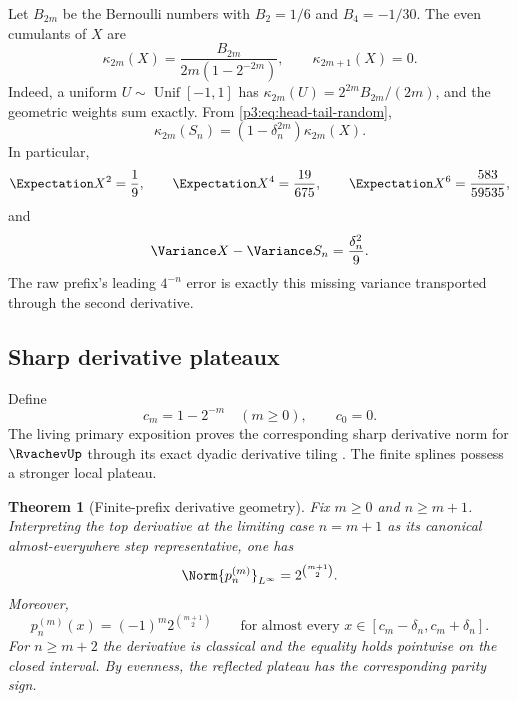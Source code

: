 \documentclass[11pt,oneside]{article}
\numberwithin{equation}{section}
\newtheorem{theorem}{Theorem}[section]
\theoremstyle{definition}
\theoremstyle{remark}
\begin{document}
Let $B_{2m}$ be the Bernoulli numbers with $B_2=1/6$ and $B_4=-1/30$.
The even cumulants of $X$ are
\begin{equation}
 \kappa_{2m}(X)=\frac{B_{2m}}{2m(1-2^{-2m})},
 \qquad \kappa_{2m+1}(X)=0.
 \label{p3:eq:cumulants-X}
\end{equation}
Indeed, a uniform $U\sim\operatorname{Unif}[-1,1]$ has
$\kappa_{2m}(U)=2^{2m}B_{2m}/(2m)$, and the geometric weights sum exactly.
From \cref{p3:eq:head-tail-random},
\begin{equation}
 \kappa_{2m}(S_n)=(1-\delta_n^{2m})\kappa_{2m}(X).
 \label{p3:eq:cumulants-prefix}
\end{equation}
In particular,
\begin{equation}
 \Expectation X^2=\frac19,
 \qquad
 \Expectation X^4=\frac{19}{675},
 \qquad
 \Expectation X^6=\frac{583}{59535},
 \label{p3:eq:central-moments}
\end{equation}
and
\begin{equation}
 \Variance X-\Variance S_n=\frac{\delta_n^2}{9}.
 \label{p3:eq:variance-defect}
\end{equation}
The raw prefix's leading $4^{-n}$ error is exactly this missing variance transported
through the second derivative.

\subsection{Sharp derivative plateaux}

Define
\begin{equation}
 c_m=1-2^{-m}\quad(m\ge0),
 \qquad c_0=0.
 \label{p3:eq:cm}
\end{equation}
The living primary exposition proves the corresponding sharp derivative norm for
$\RvachevUp$ through its exact dyadic derivative tiling \cite{p3:proveit-primary}.  The finite
splines possess a stronger local plateau.

\begin{theorem}[Finite-prefix derivative geometry]
\label{p3:thm:derivative-plateau}
Fix $m\ge0$ and $n\ge m+1$.  Interpreting the top derivative at the limiting case
$n=m+1$ as its canonical almost-everywhere step representative, one has
\begin{equation}
 \Norm{p_n^{(m)}}_{L^\infty}=2^{\binom{m+1}{2}}.
 \label{p3:eq:pn-derivative-norm}
\end{equation}
Moreover,
\begin{equation}
 p_n^{(m)}(x)=(-1)^m2^{\binom{m+1}{2}}
 \qquad
 \text{for almost every }x\in[c_m-\delta_n,c_m+\delta_n].
 \label{p3:eq:derivative-plateau}
\end{equation}
For $n\ge m+2$ the derivative is classical and the equality holds pointwise on the
closed interval.  By evenness, the reflected plateau has the corresponding parity sign.
\end{theorem}
\end{document}
